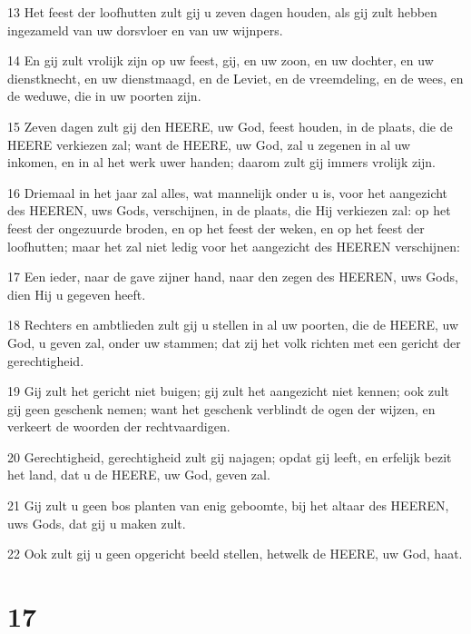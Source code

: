 \par 13 Het feest der loofhutten zult gij u zeven dagen houden, als gij zult hebben ingezameld van uw dorsvloer en van uw wijnpers.
\par 14 En gij zult vrolijk zijn op uw feest, gij, en uw zoon, en uw dochter, en uw dienstknecht, en uw dienstmaagd, en de Leviet, en de vreemdeling, en de wees, en de weduwe, die in uw poorten zijn.
\par 15 Zeven dagen zult gij den HEERE, uw God, feest houden, in de plaats, die de HEERE verkiezen zal; want de HEERE, uw God, zal u zegenen in al uw inkomen, en in al het werk uwer handen; daarom zult gij immers vrolijk zijn.
\par 16 Driemaal in het jaar zal alles, wat mannelijk onder u is, voor het aangezicht des HEEREN, uws Gods, verschijnen, in de plaats, die Hij verkiezen zal: op het feest der ongezuurde broden, en op het feest der weken, en op het feest der loofhutten; maar het zal niet ledig voor het aangezicht des HEEREN verschijnen:
\par 17 Een ieder, naar de gave zijner hand, naar den zegen des HEEREN, uws Gods, dien Hij u gegeven heeft.
\par 18 Rechters en ambtlieden zult gij u stellen in al uw poorten, die de HEERE, uw God, u geven zal, onder uw stammen; dat zij het volk richten met een gericht der gerechtigheid.
\par 19 Gij zult het gericht niet buigen; gij zult het aangezicht niet kennen; ook zult gij geen geschenk nemen; want het geschenk verblindt de ogen der wijzen, en verkeert de woorden der rechtvaardigen.
\par 20 Gerechtigheid, gerechtigheid zult gij najagen; opdat gij leeft, en erfelijk bezit het land, dat u de HEERE, uw God, geven zal.
\par 21 Gij zult u geen bos planten van enig geboomte, bij het altaar des HEEREN, uws Gods, dat gij u maken zult.
\par 22 Ook zult gij u geen opgericht beeld stellen, hetwelk de HEERE, uw God, haat.

\chapter{17}

